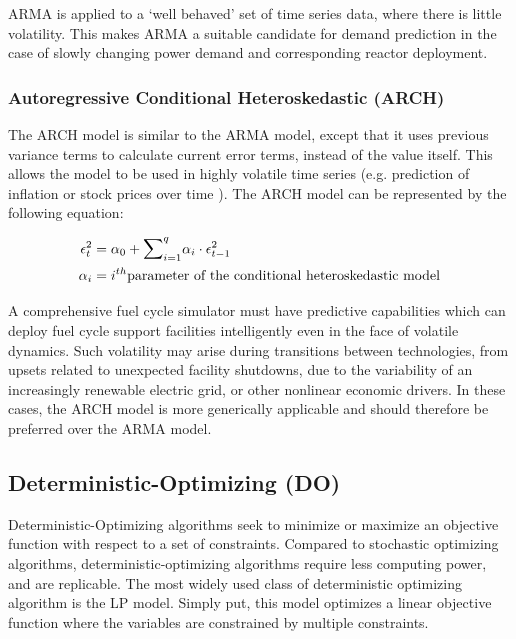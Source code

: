 \gls{ARMA} is applied to a `well behaved' set of time series data,
where there is little volatility. This makes \gls{ARMA} a suitable
candidate for demand prediction in the case of slowly changing power demand and 
corresponding reactor deployment.


\subsubsection{Autoregressive Conditional Heteroskedastic (ARCH)}
The \gls{ARCH} model is similar to the \gls{ARMA} model, except that
it uses previous variance terms to calculate current error terms, instead
of the value itself. This allows the model to be used in highly volatile 
time series (e.g. prediction of inflation or stock prices over time 
\cite{bollerslev_generalized_1986}).
The \gls{ARCH} model can be represented by the following equation:

\begin{align}
	\epsilon_t^2 &= \alpha_0+{\mathlarger{\sum}}_{i=1}^{q}\alpha_i\cdot\epsilon_{t-1}^2\\
	\alpha_i&= i^{th} \mbox{parameter of the conditional heteroskedastic model}
\end{align}

A comprehensive fuel cycle simulator must have predictive capabilities which 
can deploy fuel cycle support facilities intelligently even in the face of 
volatile dynamics. Such volatility may arise during transitions between 
technologies, from upsets related to unexpected facility shutdowns, due to the variability 
of an increasingly renewable electric grid, or other nonlinear economic 
drivers.  In these cases, the \gls{ARCH} model is more generically applicable 
and should therefore be preferred over the \gls{ARMA} 
model.



\subsection{Deterministic-Optimizing (DO)}
Deterministic-Optimizing algorithms seek to minimize or maximize an objective 
function with respect to a set of constraints. Compared to stochastic 
optimizing algorithms, deterministic-optimizing algorithms require less 
computing power, and are replicable. The most widely used class of deterministic 
optimizing algorithm is the \gls{LP} model. Simply put, this model optimizes a 
linear objective function where the variables are constrained by multiple 
constraints.

